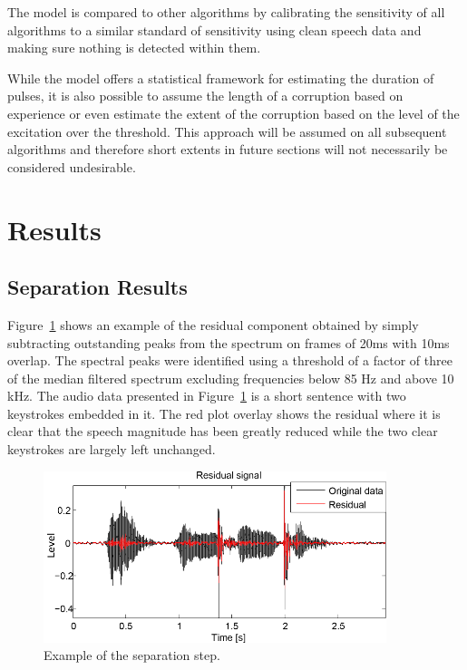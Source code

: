 The \DIFdelbegin {}\DIFdelend \DIFaddbegin {}\DIFaddend model is compared to other algorithms by calibrating the sensitivity of all algorithms to a similar standard of sensitivity using clean speech data and making sure nothing is detected within them.

While the \DIFdelbegin {}\DIFdelend \DIFaddbegin {}\DIFaddend model offers a statistical framework for estimating the duration of pulses, it is also possible to assume the length of a corruption based on experience or even estimate the extent of the corruption based on the level of the excitation over the threshold. This approach will be assumed on all subsequent algorithms and therefore short \DIFdelbegin {}\DIFdelend \DIFaddbegin {}\DIFaddend extents in future sections will not necessarily be considered undesirable.

\section{Results}\label{sec:WPresults}
\subsection{Separation Results} %
Figure~\ref{fig:Separation_Residual_Example} shows an example of the residual component obtained by simply subtracting outstanding peaks from the spectrum on frames of 20ms with 10ms overlap. The spectral peaks were identified using a threshold of a factor of three of the median filtered spectrum excluding frequencies below 85 Hz and above 10 kHz. The audio data presented in Figure~\ref{fig:Separation_Residual_Example} is a short sentence with two keystrokes embedded in it. The red plot overlay shows the residual where it is clear that the speech magnitude has been greatly reduced while the two clear keystrokes are largely left unchanged. 

\begin{figure}
\begin{minipage}[b]{1.0\linewidth}
  \centering
  \centerline{\includegraphics[width=10cm]{Separation_Residual_Example}}
\end{minipage}
\caption{Example of the separation step.}
\label{fig:Separation_Residual_Example}
\end{figure}

